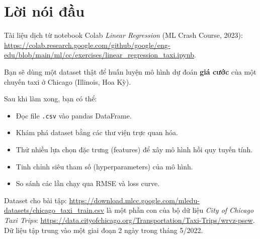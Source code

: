 \documentclass[12pt,a4paper]{article}
\newcommand{\mlccurl}[1]{\url{#1}}
\begin{document}

\newpage
\tableofcontents
\newpage

\section*{Lời nói đầu}

\begin{ynghia}[title={Nguồn}]
Tài liệu dịch từ notebook Colab \textit{Linear Regression} (ML Crash Course, 2023):
\mlccurl{https://colab.research.google.com/github/google/eng-edu/blob/main/ml/cc/exercises/linear_regression_taxi.ipynb}.
\end{ynghia}

\begin{dongco}[title={target bài tập}]
Bạn sẽ dùng một dataset thật để huấn luyện mô hình dự đoán \textbf{giá cước} của một chuyến taxi ở Chicago (Illinois, Hoa Kỳ).
\end{dongco}

\begin{phuongphap}[title={target học tập}]
Sau khi làm xong, bạn có thể:
\begin{itemize}
  \item Đọc file \texttt{.csv} vào pandas DataFrame.
  \item Khám phá dataset bằng các thư viện trực quan hóa.
  \item Thử nhiều lựa chọn đặc trưng (features) để xây mô hình hồi quy tuyến tính.
  \item Tinh chỉnh siêu tham số (hyperparameters) của mô hình.
  \item So sánh các lần chạy qua RMSE và loss curve.
\end{itemize}
\end{phuongphap}

\begin{ynghia}[title={Mô tả dataset}]
Dataset cho bài tập:
\mlccurl{https://download.mlcc.google.com/mledu-datasets/chicago_taxi_train.csv}
là một phần con của bộ dữ liệu \textit{City of Chicago Taxi Trips}:
\mlccurl{https://data.cityofchicago.org/Transportation/Taxi-Trips/wrvz-psew}.
Dữ liệu tập trung vào một giai đoạn 2 ngày trong tháng 5/2022.
\end{ynghia}

\newpage

\end{document}
